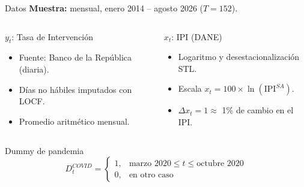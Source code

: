 \documentclass[aspectratio=169,11pt]{beamer}
\begin{document}
\begin{frame}[t]{Datos}
  \textbf{Muestra:} mensual, enero 2014 -- agosto 2026 ($T=152$).
  \vspace{2mm}
  \begin{columns}[T]
    \begin{block}{$y_t$: Tasa de Intervención}
      \begin{itemize}
        \item Fuente: Banco de la República (diaria).
        \item Días no hábiles imputados con LOCF.
        \item Promedio aritmético mensual.
      \end{itemize}
    \end{block}
    \begin{block}{$x_t$: IPI (DANE)}
      \begin{itemize}
        \item Logaritmo y desestacionalización STL.
        \item Escala $x_t = 100\times\ln(\mathrm{IPI}^{SA})$.
        \item $\Delta x_t = 1 \approx$ 1\% de cambio en el IPI.
      \end{itemize}
    \end{block}
  \end{columns}
  \vspace{2mm}
  \begin{block}{Dummy de pandemia}
    \[
      D_t^{COVID} =
      \begin{cases}
        1, & \text{marzo 2020} \le t \le \text{octubre 2020}\\
        0, & \text{en otro caso}
      \end{cases}
    \]
  \end{block}
\end{frame}
\end{document}

